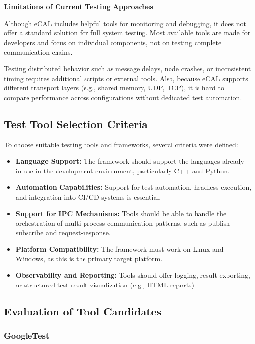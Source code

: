 \newpage
\textbf{Limitations of Current Testing Approaches}

\vspace{0.4em}
Although eCAL includes helpful tools for monitoring and debugging, it does not offer a standard solution for full system testing. Most available tools are made for developers and focus on individual components, not on testing complete communication chains.

\vspace{1em}
Testing distributed behavior such as message delays, node crashes, or inconsistent timing requires additional scripts or external tools. Also, because eCAL supports different transport layers (e.g., shared memory, UDP, TCP), it is hard to compare performance across configurations without dedicated test automation.

\subsection{Test Tool Selection Criteria}

To choose suitable testing tools and frameworks, several criteria were defined:

\begin{itemize}
	\item \textbf{Language Support:} The framework should support the languages already in use in the development environment, particularly C++ and Python.
	\item \textbf{Automation Capabilities:} Support for test automation, headless execution, and integration into CI/CD systems is essential.
	\item \textbf{Support for IPC Mechanisms:} Tools should be able to handle the orchestration of multi-process communication patterns, such as publish-subscribe and request-response.
	\item \textbf{Platform Compatibility:} The framework must work on Linux and Windows, as this is the primary target platform.
	\item \textbf{Observability and Reporting:} Tools should offer logging, result exporting, or structured test result visualization (e.g., HTML reports).
\end{itemize}

\newpage
\subsection{Evaluation of Tool Candidates}

\subsubsection*{GoogleTest}

